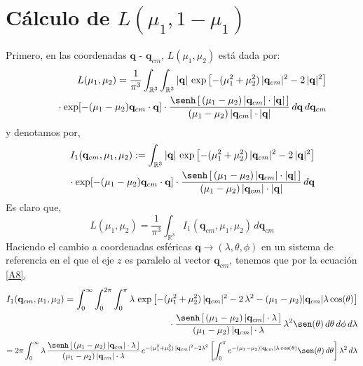 \documentclass[12pt]{book}
\numberwithin{equation}{chapter}
\def\q{\mathbf{q}}
\def\R{\mathbb{R}}
\def\t{\theta}
\def\p{\phi}
\def\l{\lambda}
\begin{document}
\chapter{C\'alculo de $L(\mu_{1},1-\mu_{1})$}
Primero, en las coordenadas $\q$ - $\q_{cm}$, $L(\mu_{1},\mu_{2})$ est\'a dada por: 
\begin{align}\label{L}
L(\mu_{1},\mu_{2})= 
\frac{1}{\pi^{3}}  \int_{\R^{3}} \int_{\R^{3}}
|\q|\, \exp \left[ -(\mu_{1}^{2}+\mu_{2}^{2})\, |\q_{cm}|^{2} - 2\,|\q|^{2}
 \right] 
\nonumber\\
\qquad  \vphantom{\int_{\R^{6}}}
\cdot \exp[ -(\mu_{1}-\mu_{2})\q_{cm}\cdot \q ] 
\cdot \frac{ \senh \left[\, (\mu_{1}-\mu_{2})\, |\q_{cm}|\cdot |\q| \, \right]}{ (\mu_{1}-\mu_{2})\, |\q_{cm}|\cdot |\q| }
\,d\q \, d\q_{cm} 
\end{align}
y denotamos por,
\begin{align}\label{I1}
I_{1}(\q_{cm},\mu_{1},\mu_{2}):= 
\int_{\R^{3}}
|\q|\, \exp \left[ -(\mu_{1}^{2}+\mu_{2}^{2})\, |\q_{cm}|^{2} - 2\,|\q|^{2}
 \right] 
\nonumber\\
\qquad  \vphantom{\int_{\R^{6}}}
\cdot \exp[ -(\mu_{1}-\mu_{2})\q_{cm}\cdot \q ] 
\cdot \frac{ \senh \left[\, (\mu_{1}-\mu_{2})\, |\q_{cm}|\cdot |\q| \, \right]}{ (\mu_{1}-\mu_{2})\, |\q_{cm}|\cdot |\q| }
\,d\q 
\end{align}
Es claro que, 
\begin{equation}\label{LI}
L(\mu_{1},\mu_{2})= \frac{1}{\pi^{3}} \int_{\R^{3}} I_{1}(\q_{cm},\mu_{1},\mu_{2}) \, d\q_{cm} 
\end{equation}
Haciendo el cambio a coordenadas esf\'ericas $\q \rightarrow (\l, \t,\p) $ en un sistema de referencia en el que el eje $z$ es paralelo al vector $\q_{cm}$, tenemos que por la ecuaci\'on \eqref{A8},
\begin{align}
I_{1}(\q_{cm},\mu_{1},\mu_{2})= 
\int_{0}^{\infty} \int_{0}^{2\pi} \int_{0}^{\pi}
\l \, \exp \left[ -(\mu_{1}^{2}+\mu_{2}^{2})\, |\q_{cm}|^{2} - 2\, \l^{2}-(\mu_{1}-\mu_{2}) |\q_{cm}|\l \cos(\theta)
 \right] 
\nonumber\\
\qquad  \vphantom{\int_{\R^{3}}}
\cdot \frac{ \senh \left[\, (\mu_{1}-\mu_{2})\, |\q_{cm}|\cdot \l \, \right]}{ (\mu_{1}-\mu_{2})\, |\q_{cm}|\cdot \l }
\, \l^{2} \sen(\t) \, d\t \, d\p \,d \l  \nonumber
\end{align}
$$= 2\pi \int_{0}^{\infty} \l \, \frac{ \senh \left[\, (\mu_{1}-\mu_{2})\, |\q_{cm}|\cdot \l \, \right]}{ (\mu_{1}-\mu_{2})\, |\q_{cm}|\cdot \l }\, e^{-(\mu_{1}^{2}+\mu_{2}^{2})\, |\q_{cm}|^{2} - 2 \l^{2}} \left[\int_{0}^{\pi} e^{-(\mu_{1}-\mu_{2}) |\q_{cm}|\l \cos(\theta)} \sen (\t) \, d\t \right] \l^{2}\, d\l $$
\end{document}
